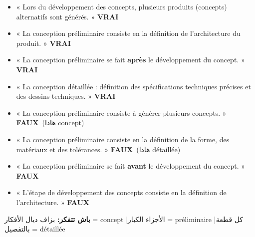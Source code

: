 \documentclass[11pt,a4paper]{article}
\newcommand{\ar}[1]{\textarabic{#1}}
\newcommand{\fr}[1]{\textfrench{#1}}
\newcommand{\vrai}{\textcolor{vert}{\textbf{VRAI}}}
\newcommand{\faux}{\textcolor{rouge}{\textbf{FAUX}}}
\begin{document}
\begin{examen}
\begin{itemize}
\item « Lors du développement des concepts, plusieurs produits (concepts) alternatifs sont générés. » \vrai
\item « La conception préliminaire consiste en la définition de l'architecture du produit. » \vrai
\item « La conception préliminaire se fait \textbf{après} le développement du concept. » \vrai
\item « La conception détaillée : définition des spécifications techniques précises et des dessins techniques. » \vrai
\end{itemize}
\end{examen}
\begin{piege}
\begin{itemize}
\item « La conception préliminaire consiste à générer plusieurs concepts. » \faux \ \ar{(هادا \fr{concept})}
\item « La conception préliminaire consiste en la définition de la forme, des matériaux et des tolérances. » \faux \ \ar{(هادا \fr{détaillée})}
\item « La conception préliminaire se fait \textbf{avant} le développement du concept. » \faux
\item « L'étape de développement des concepts consiste en la définition de l'architecture. » \faux
\end{itemize}
\end{piege}
\begin{note}
\par\begin{Arabic}
\textbf{باش تتفكر:} بزاف ديال الأفكار = \fr{concept} \quad|\quad الأجزاء الكبار = \fr{préliminaire} \quad|\quad كل قطعة بالتفصيل = \fr{détaillée}
\end{Arabic}
\end{note}
\end{document}
